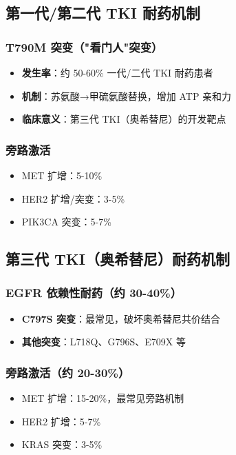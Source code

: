 \documentclass[12pt,a4paper]{article}
\begin{document}
\subsection{第一代/第二代 TKI 耐药机制}

\subsubsection{T790M 突变（"看门人"突变）}
\begin{itemize}
    \item \textbf{发生率}：约 50-60\% 一代/二代 TKI 耐药患者
    \item \textbf{机制}：苏氨酸→甲硫氨酸替换，增加 ATP 亲和力
    \item \textbf{临床意义}：第三代 TKI（奥希替尼）的开发靶点
\end{itemize}

\subsubsection{旁路激活}
\begin{itemize}
    \item MET 扩增：5-10\%
    \item HER2 扩增/突变：3-5\%
    \item PIK3CA 突变：5-7\%
\end{itemize}

\subsection{第三代 TKI（奥希替尼）耐药机制}

\subsubsection{EGFR 依赖性耐药（约 30-40\%）}
\begin{itemize}
    \item \textbf{C797S 突变}：最常见，破坏奥希替尼共价结合
    \item \textbf{其他突变}：L718Q、G796S、E709X 等
\end{itemize}

\subsubsection{旁路激活（约 20-30\%）}
\begin{itemize}
    \item MET 扩增：15-20\%，最常见旁路机制
    \item HER2 扩增：5-7\%
    \item KRAS 突变：3-5\%
\end{itemize}
\end{document}
